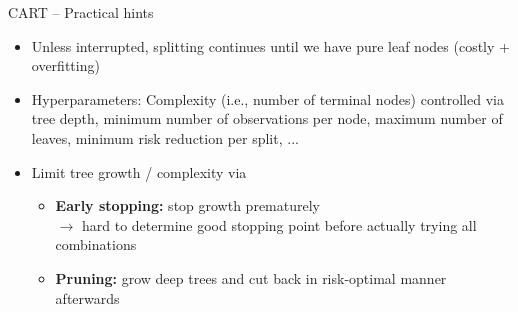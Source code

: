 \begin{frame}{CART -- Practical hints}

\footnotesize


\begin{itemize}
  \item Unless interrupted, splitting continues until we have pure leaf nodes (costly + overfitting)
  \item Hyperparameters: Complexity (i.e., number of terminal nodes) controlled via tree depth, minimum number of observations per node, maximum number of leaves, minimum risk reduction per split, ...
  \item Limit tree growth / complexity via
  \begin{itemize}
    \item \textbf{Early stopping:} stop growth prematurely \\ $\rightarrow$ hard 
    to determine good stopping point before actually trying all combinations
    \item \textbf{Pruning:} grow deep trees and cut back in risk-optimal manner afterwards
  \end{itemize}
\end{itemize}

\medskip

   

\end{frame}
